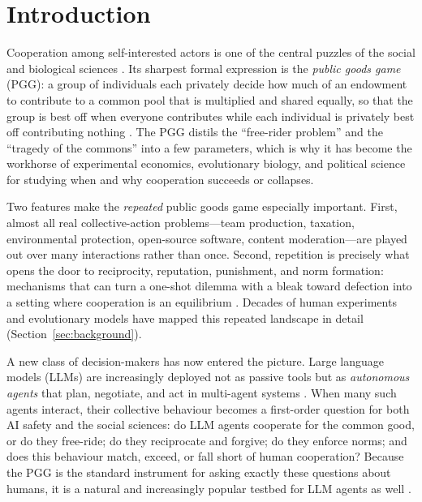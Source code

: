 \documentclass[11pt,a4paper]{article}
\newcommand{\pgg}{public goods game}
\begin{document}
\section{Introduction}

Cooperation among self-interested actors is one of the central puzzles of the
social and biological sciences \citep{nowak2006five}. Its sharpest formal
expression is the \emph{\pgg{}} (PGG): a group of individuals each privately
decide how much of an endowment to contribute to a common pool that is multiplied
and shared equally, so that the group is best off when everyone contributes while
each individual is privately best off contributing nothing
\citep{samuelson1954pure,olson1965logic,ledyard1995public}. The PGG distils the
``free-rider problem'' and the ``tragedy of the commons''
\citep{hardin1968tragedy} into a few parameters, which is why it has become the
workhorse of experimental economics, evolutionary biology, and political science
for studying when and why cooperation succeeds or collapses.

Two features make the \emph{repeated} \pgg{} especially important. First, almost
all real collective-action problems---team production, taxation, environmental
protection, open-source software, content moderation---are played out over many
interactions rather than once. Second, repetition is precisely what opens the
door to reciprocity, reputation, punishment, and norm formation: mechanisms that
can turn a one-shot dilemma with a bleak toward defection into a setting where
cooperation is an equilibrium \citep{vansegbroeck2012emergence,fehr2000cooperation}.
Decades of human experiments and evolutionary models have mapped this repeated
landscape in detail (Section~\ref{sec:background}).

A new class of decision-makers has now entered the picture. Large language models
(LLMs) are increasingly deployed not as passive tools but as \emph{autonomous
agents} that plan, negotiate, and act in multi-agent systems
\citep{park2023generative,guo2024multiagent}. When many such agents interact,
their collective behaviour becomes a first-order question for both AI safety and
the social sciences: do LLM agents cooperate for the common good, or do they
free-ride; do they reciprocate and forgive; do they enforce norms; and does this
behaviour match, exceed, or fall short of human cooperation? Because the PGG is
the standard instrument for asking exactly these questions about humans, it is a
natural and increasingly popular testbed for LLM agents as well
\citep{guzman2025corrupted,sreedhar2025simulating,piatti2024govsim}.
\end{document}
